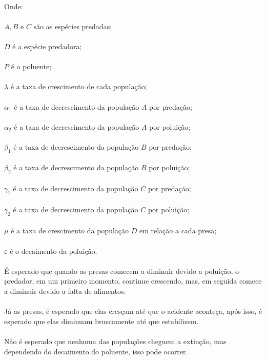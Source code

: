 \documentclass[a4paper]{article}
\begin{document}
\\
Onde:
\\
\\
$A, B$ e $C$ s\~ao as esp\'ecies predadas;
\\
\\
$D$ \'e a esp\'ecie predadora;
\\
\\
$P$ \'e o poluente;
\\
\\
$\lambda$ \'e a taxa de crescimento de cada popula\c{c}\~ao;
\\
\\
$\alpha_1$ \'e a taxa de decrescimento da popula\c{c}\~ao $A$ por preda\c{c}\~ao;
\\
\\
$\alpha_2$ \'e a taxa de decrescimento da popula\c{c}\~ao $A$ por polui\c{c}\~ao;
\\
\\
$\beta_1$ \'e a taxa de decrescimento da popula\c{c}\~ao $B$ por preda\c{c}\~ao;
\\
\\
$\beta_2$ \'e a taxa de decrescimento da popula\c{c}\~ao $B$ por polui\c{c}\~ao;
\\
\\
$\gamma_1$ \'e a taxa de decrescimento da popula\c{c}\~ao $C$ por preda\c{c}\~ao;
\\
\\
$\gamma_2$ \'e a taxa de decrescimento da popula\c{c}\~ao $C$ por polui\c{c}\~ao;
\\
\\
$\mu$ \'e a taxa de crescimento da popula\c{c}\~ao $D$ em rela\c{c}\~ao a cada presa;
\\
\\
$\varepsilon$ \'e o decaimento da polui\c{c}\~ao.
\\
\\
\'E esperado que quando as presas comecem a diminuir devido a polui\c{c}\~ao, o predador, em um primeiro momento, continue crescendo, mas, em seguida comece a diminuir devido a falta de alimentos.
\\
\\
J\'a as presas, \'e esperado que elas cres\c{c}am at\'e que o acidente aconte\c{c}a, ap\'os isso, \'e esperado que elas diminuam bruscamente at\'e que estabilizem.
\\
\\
N\~ao \'e esperado que nenhuma das popula\c{c}\~oes cheguem a extin\c{c}\~ao, mas dependendo do decaimento do poluente, isso pode ocorrer.
\\
\\
\end{document}
